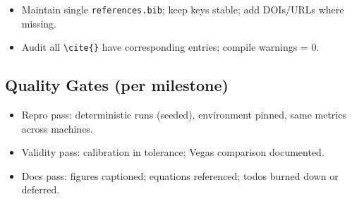 \begin{itemize}
  \item {} Maintain single \texttt{references.bib}; keep keys stable; add DOIs/URLs where missing.
  \item {} Audit all \texttt{\textbackslash cite\{\}} have corresponding entries; compile warnings = 0.
\end{itemize}

\subsection*{Quality Gates (per milestone)}
\begin{itemize}
  \item Repro pass: deterministic runs (seeded), environment pinned, same metrics across machines.
  \item Validity pass: calibration in tolerance; Vegas comparison documented.
  \item Docs pass: figures captioned; equations referenced; todos burned down or deferred.
\end{itemize}

\endgroup
